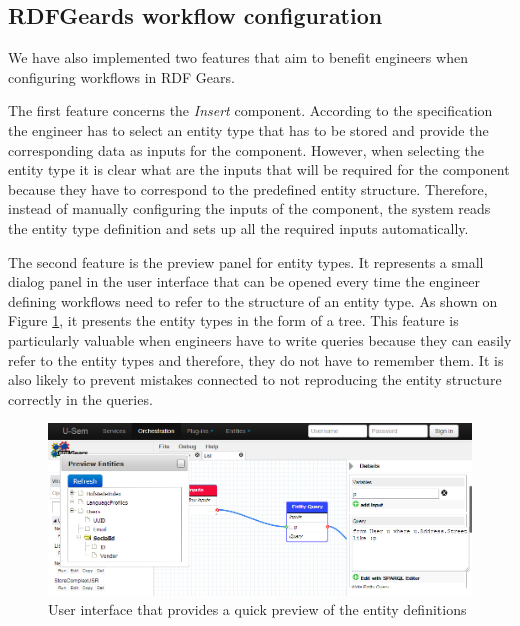 \begin{itemize}
	\end{itemize}


\subsection{RDFGeards workflow configuration}
We have also implemented two features that aim to benefit engineers when configuring workflows in RDF Gears.

The first feature concerns the \textit{Insert} component. According to the specification the engineer has to select an entity type that has to be stored and provide the corresponding data as inputs for the component. However, when selecting the entity type it is clear what are the inputs that will be required for the component because they have to correspond to the predefined entity structure. Therefore, instead of manually configuring the inputs of the component, the system reads the entity type definition and sets up all the required inputs automatically.

The second feature is the preview panel for entity types. It represents a small dialog panel in the user interface that can be opened every time the engineer defining workflows need to refer to the structure of an entity type. As shown on Figure \ref{fig:storageEntityPreview}, it presents the entity types in the form of a tree. This feature is particularly valuable when engineers have to write queries because they can easily refer to the entity types and therefore, they do not have to remember them. It is also likely to prevent mistakes connected to not reproducing the entity structure correctly in the queries.

\begin{figure}[h!]
  \centering
  	\includegraphics[scale=0.55]{storage/ui/entityPreview.png}
  \caption{User interface that provides a quick preview of the entity definitions}
  \label{fig:storageEntityPreview}
\end{figure}

